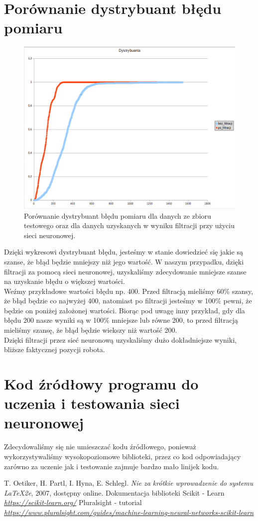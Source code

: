 \documentclass{classrep}
\begin{document}
\section{Porównanie dystrybuant błędu pomiaru}
{
	\begin{figure}[htp]
	\centering
	\includegraphics[width=15cm]{Wykres.png}
	\caption{Porównanie dystrybuant błędu pomiaru dla danych ze zbioru testowego oraz dla danych uzyskanych w wyniku filtracji przy użyciu sieci neuronowej. }
	\label{fig:lion}
	\end{figure}
	Dzięki wykresowi dystrybuant błędu, jesteśmy w stanie dowiedzieć się jakie są szanse, że błąd będzie mniejszy niż jego wartość. W naszym przypadku, dzięki filtracji za pomocą sieci neuronowej, uzyskaliśmy zdecydowanie mniejsze szanse na uzyskanie błędu o większej wartości. \\ 
	Weźmy przykładowe wartości błędu np. 400. Przed filtracją mieliśmy 60\% szansy, że błąd będzie co najwyżej 400, natomiast po filtracji jesteśmy w 100\% pewni, że będzie on poniżej założonej wartości. Biorąc pod uwagę inny przykład, gdy dla błędu 200 nasze wyniki są w 100\% mniejsze lub równe 200, to przed filtracją mieliśmy szansę, że błąd będzie wiekszy niż wartość 200.\\
	Dzięki filtracji przez sieć neuronową uzyskaliśmy dużo dokładniejsze wyniki, bliższe faktycznej pozycji robota.
}

\section{Kod źródłowy programu do uczenia i testowania sieci neuronowej}
{
	Zdecydowaliśmy się nie umieszczać kodu źródłowego, ponieważ wykorzystywaliśmy wysokopoziomowe biblioteki, przez co kod odpowiadający zarówno za uczenie jak i testowanie zajmuje 	bardzo mało linijek kodu.
}

\begin{thebibliography}{0}
   T. Oetiker, H. Partl, I. Hyna, E. Schlegl.
    \textsl{Nie za krótkie wprowadzenie do systemu \LaTeX2e}, 2007, dostępny
    online.
 Dokumentacja biblioteki Scikit - Learn
	\textsl{\url{https://scikit-learn.org/}}
 Pluralsight - tutorial
	\textsl{ \url{https://www.pluralsight.com/guides/machine-learning-neural-networks-scikit-learn}}
\end{thebibliography}
\end{document}
